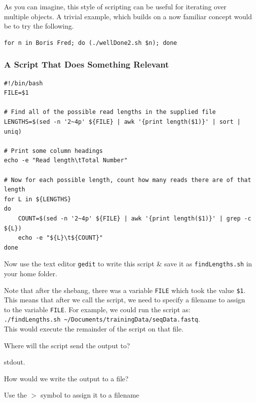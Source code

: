 \documentclass[a4paper,12pt,twoside]{memoir}
\begin{document}
\begin{advanced}
As you can imagine, this style of scripting can be useful for iterating over multiple objects.
A trivial example, which builds on a now familiar concept would be to try the following.
\begin{lstlisting}
for n in Boris Fred; do (./wellDone2.sh $n); done
\end{lstlisting}
\end{advanced}

\subsubsection*{A Script That Does Something Relevant}
\begin{lstlisting}
#!/bin/bash
FILE=$1

# Find all of the possible read lengths in the supplied file
LENGTHS=$(sed -n '2~4p' ${FILE} | awk '{print length($1)}' | sort | uniq)

# Print some column headings
echo -e "Read length\tTotal Number"

# Now for each possible length, count how many reads there are of that length
for L in ${LENGTHS}
do
	COUNT=$(sed -n '2~4p' ${FILE} | awk '{print length($1)}' | grep -c ${L})
	echo -e "${L}\t${COUNT}" 
done
\end{lstlisting}

\begin{steps}
Now use the text editor \texttt{gedit} to write this script \& save it as \texttt{findLengths.sh} in your home folder.
\end{steps}

\begin{note}
Note that after the shebang, there was a variable \texttt{FILE} which took the value \texttt{\$1}.
This means that after we call the script, we need to specify a filename to assign to the variable \texttt{FILE}.
For example, we could run the script as: \\
\texttt{./findLengths.sh \~{}/Documents/trainingData/seqData.fastq}.\\
This would execute the remainder of the script on that file. \\
\end{note}

\begin{questions}
Where will the script send the output to?
\begin{answer}
stdout.
\end{answer}

How would we write the output to a file?
\begin{answer}
Use the $>$ symbol to assign it to a filename
\end{answer}
\end{questions}
\end{document}
